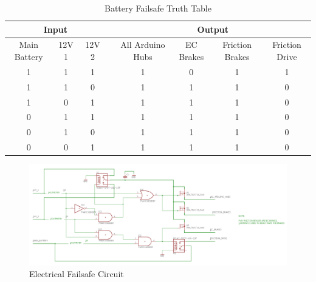 \documentclass[main.tex]{subfiles}
\begin{document}
\begin{table}[H]    
\centering
\begin{tabular}{@{}ccc|ccccc@{}} \toprule
\multicolumn{3}{c}{Input} &  & \multicolumn{4}{c}{Output}                                    \\ 
\midrule
Main Battery & 12V 1 & 12V 2 &  & All Arduino Hubs & EC Brakes & Friction Brakes & Friction Drive \\ \midrule
1            & 1     & 1     &  & 1                & 0         & 1               & 1              \\
1            & 1     & 0     &  & 1                & 1         & 1               & 0              \\
1            & 0     & 1     &  & 1                & 1         & 1               & 0              \\
0            & 1     & 1     &  & 1                & 1         & 1               & 0              \\
0            & 1     & 0     &  & 1                & 1         & 1               & 0              \\
0            & 0     & 1     &  & 1                & 1         & 1               & 0              \\
\bottomrule
\end{tabular}
\caption{Battery Failsafe Truth Table}
\label{tab:efailsafe}
\end{table}

    \begin{figure}[H]
        \centering
        \includegraphics[scale = 0.5]{images/Failsafe}
        \caption{Electrical Failsafe Circuit }
        \label{Failsafe}
    \end{figure} 
    
\end{document}
